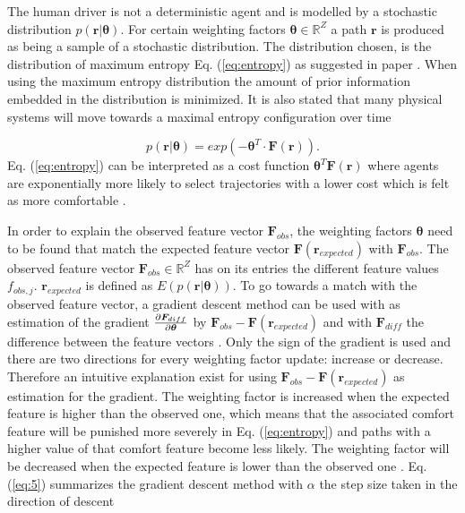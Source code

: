 The human driver is not a deterministic agent and is modelled by a stochastic distribution $p(\bm{r}|\bm{\theta})$. For certain weighting factors $\bm{\theta} \in \mathbb{R}^Z$ a path $\bm{r}$ is produced as being a sample of a stochastic distribution. The distribution chosen, is the distribution of maximum entropy Eq. (\ref{eq:entropy}) as suggested in paper \cite{Ziebart2008}. When using the maximum entropy distribution the amount of prior information embedded in the distribution is minimized. It is also stated that many physical systems will move towards a maximal entropy configuration over time
	
\begin{equation}\label{eq:entropy}
	p(\bm{r}|\bm{\theta}) = exp(-\bm{\theta}^T\cdot \bm{F}(\bm{r})).
\end{equation}
Eq. (\ref{eq:entropy}) can be interpreted as a cost function $\bm{\theta}^T\bm{F}(\bm{r})$ where agents are exponentially more likely to select trajectories with a lower cost which is felt as more comfortable \cite{Kuderer2015a}.

In order to explain the observed feature vector $\bm{F}_{obs}$, the weighting factors $\bm{\theta}$ need to be found that match the expected feature vector $\bm{F}(\bm{r}_{expected})$ with $\bm{F}_{obs}$. The observed feature vector $\bm{F}_{obs} \in \mathbb{R}^Z$ has on its entries the different feature values $f_{obs,j}$. $\bm{r}_{expected}$ is defined as $ E(p(\bm{r}|\bm{\theta}))$. To go towards a match with the observed feature vector, a gradient descent method can be used with as estimation of the gradient $\pdv{\bm{F}_{diff}}{\bm{\theta}}$ by $\bm{F}_{obs} - \bm{F}(\bm{r}_{expected})$ and with $\bm{F}_{diff}$ the difference between the feature vectors \cite{Ziebart2008, Kretzschmar2014}. Only the sign of the gradient is used and there are two directions for every weighting factor update: increase or decrease. Therefore an intuitive explanation exist for using $\bm{F}_{obs} - \bm{F}(\bm{r}_{expected})$ as estimation for the gradient. The weighting factor is increased when the expected feature is higher than the observed one, which means that the associated comfort feature will be punished more severely in Eq. (\ref{eq:entropy}) and paths with a higher value of that comfort feature become less likely. The weighting factor will be decreased when the expected feature is lower than the observed one \cite{Kuderer2015a}. Eq. (\ref{eq:5}) summarizes the gradient descent method with $\alpha$ the step size taken in the direction of descent

